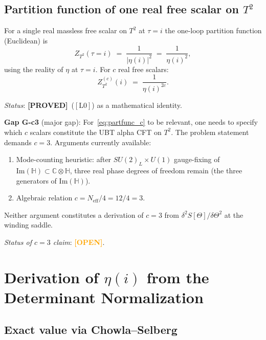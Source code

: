 \documentclass[12pt,a4paper]{article}
\theoremstyle{definition}
\theoremstyle{remark}
\newcommand{\PROVED}{\textcolor{green!60!black}{\textbf{[PROVED]}}}
\newcommand{\OPEN}{\textcolor{orange}{\textbf{[OPEN]}}}
\newcommand{\Lzero}{$[\mathrm{L0}]$}
\newcommand{\Neff}{N_{\mathrm{eff}}}
\newcommand{\CC}{\mathbb{C}}
\newcommand{\HH}{\mathbb{H}}
\begin{document}
\subsection{Partition function of one real free scalar on $T^2$}

For a single real massless free scalar on $T^2$ at $\tau = i$ the one-loop
partition function (Euclidean) is
\begin{equation}\label{eq:partfunc}
  Z_{T^2}(\tau=i)
  \;=\; \frac{1}{|\eta(i)|^2}
  \;=\; \frac{1}{\eta(i)^2},
\end{equation}
using the reality of $\eta$ at $\tau = i$.  For $c$ real free scalars:
\begin{equation}\label{eq:partfunc_c}
  Z^{(c)}_{T^2}(i) \;=\; \frac{1}{\eta(i)^{2c}}.
\end{equation}

\noindent\textit{Status}: \PROVED\ (\Lzero) as a mathematical identity.

\begin{gapbox}
\textbf{Gap G-c3} (major gap): For~\eqref{eq:partfunc_c} to be relevant,
one needs to specify which $c$ scalars constitute the UBT alpha CFT on $T^2$.
The problem statement demands $c = 3$.  Arguments currently available:
\begin{enumerate}
  \item Mode-counting heuristic: after $SU(2)_L\times U(1)$ gauge-fixing of
        $\mathrm{Im}(\HH)\subset\CC\otimes\HH$, three real phase degrees of
        freedom remain (the three generators of $\mathrm{Im}(\HH)$).
  \item Algebraic relation $c = \Neff/4 = 12/4 = 3$.
\end{enumerate}
Neither argument constitutes a derivation of $c = 3$ from
$\delta^2 S[\Theta]/\delta\Theta^2$ at the winding saddle.
\end{gapbox}

\noindent\textit{Status of $c = 3$ claim}: \OPEN.

\section{Derivation of $\eta(i)$ from the Determinant Normalization}
\label{sec:eta:etaderiv}

\subsection{Exact value via Chowla--Selberg}
\end{document}
